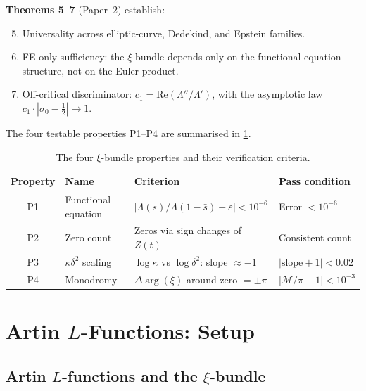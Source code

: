 \documentclass[11pt, a4paper]{article}
\theoremstyle{plain}
\theoremstyle{definition}
\newcommand{\abs}[1]{\left|#1\right|}
\newcommand{\Lam}{\Lambda}             %
\newcommand{\kap}{\kappa}             %
\newcommand{\mono}{\mathcal{M}}       %
\begin{document}
\noindent\textbf{Theorems 5--7} (Paper~2) establish:
\begin{enumerate}\setcounter{enumi}{4}
  \item Universality across elliptic-curve, Dedekind, and Epstein
    families.
  \item FE-only sufficiency: the $\xi$-bundle depends only on the
    functional equation structure, not on the Euler product.
  \item Off-critical discriminator: $c_{1} =
    \mathrm{Re}(\Lam''/\Lam')$, with the asymptotic law
    $c_{1}\cdot\abs{\sigma_{0}-\tfrac{1}{2}} \to 1$.
\end{enumerate}

The four testable properties P1--P4 are summarised in
\cref{tab:properties}.

\begin{table}[ht]
\centering
\caption{The four $\xi$-bundle properties and their verification criteria.}
\label{tab:properties}
\begin{tabular}{@{}clll@{}}
\toprule
\textbf{Property} & \textbf{Name} & \textbf{Criterion} & \textbf{Pass condition} \\
\midrule
P1 & Functional equation & $\abs{\Lam(s)/\Lam(1-\bar{s}) - \varepsilon} < 10^{-6}$ & Error $< 10^{-6}$ \\
P2 & Zero count & Zeros via sign changes of $Z(t)$ & Consistent count \\
P3 & $\kap\delta^{2}$ scaling & $\log\kap$ vs $\log\delta^{2}$: slope $\approx -1$ & $\abs{\text{slope}+1} < 0.02$ \\
P4 & Monodromy & $\Delta\arg(\xi)$ around zero $= \pm\pi$ & $\abs{\mono/\pi - 1} < 10^{-3}$ \\
\bottomrule
\end{tabular}
\end{table}


\section{Artin $L$-Functions: Setup}
\label{sec:artin-setup}

\subsection{Artin $L$-functions and the $\xi$-bundle}
\label{sec:artin-general}
\end{document}
